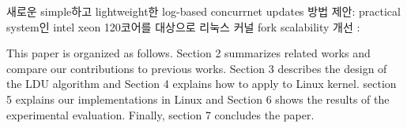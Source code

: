 \ifkor
새로운 simple하고 lightweight한 log-based concurrnet updates 방법 제안:
practical system인 intel xeon 120코어를 대상으로 리눅스 커널 fork scalability 개선 :
\else

\fi





%
%
This paper is organized as follows. 
Section 2 summarizes related works and compare our contributions to previous
works. 
Section 3 describes the design of the LDU algorithm and 
Section 4 explains how to apply to Linux kernel.
section 5 explains our implementations in Linux and
Section 6 shows the results of the experimental evaluation. 
Finally, section 7 concludes the paper.



%
%







